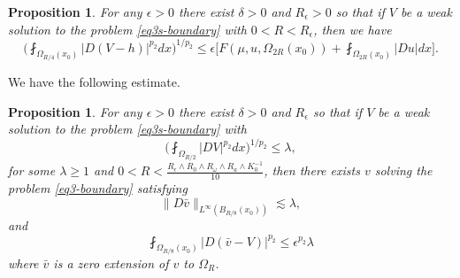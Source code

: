 \documentclass[a4paper,10pt]{amsart}
\newtheorem{prop}[thm]{Proposition}
\newcommand{\lesi}{\lesssim}
\newcommand{\f}{\frac}
\newcommand{\om}{\omega}
\newcommand{\Om}{\Omega}
\newcommand{\vc}{\infty}
\begin{document}
\begin{prop}
	\label{prop3-boundary}
	For any $\epsilon > 0$ there exist $\delta>0$ and $R_\epsilon>0$ so that if $V$ be a weak solution to the problem \eqref{eq3s-boundary} with $0<R<R_\epsilon$, then we have
	\begin{equation}\label{eq2-prop3-boundary}
	\Big(\fint_{\Om_{R/4}(x_0)}|D(V-h)|^{p_2}dx\Big)^{1/p_2}\leq \epsilon\Big[F(\mu,u,\Om_{2R}(x_0))+\fint_{\Om_{2R}(x_0)}|Du|dx\Big].
	\end{equation}
\end{prop}
We have the following estimate.
\begin{prop}
	\label{prop3-boundary}
	For any $\epsilon > 0$ there exist $\delta>0$ and $R_\epsilon$ so that if $V$ be a weak solution to the problem \eqref{eq3s-boundary} with
	\begin{equation}\label{eq-ineq Vp2}
	\Big(\fint_{\Om_{R/2}}|DV|^{p_2}dx\Big)^{1/p_2}\leq \lambda,
	\end{equation}
	for some $\lambda\geq 1$ and $0<R<\f{R_{\epsilon}\wedge R_0\wedge R_\om\wedge R_a \wedge K_0^{-1}}{10}$, then there exists $v$ solving the problem \eqref{eq3-boundary} satisfying
		\begin{equation}\label{eq1-prop4}
		\|D\bar{v}\|_{L^{\vc}(B_{R/8}(x_0))}\lesi \lambda,
	\end{equation}
	and
	\begin{equation}
	\label{eq2-prop4}
	\fint_{\Om_{R/8}(x_0)}|D(\bar{v}-V)|^{p_2}\leq \epsilon^{p_2}\lambda
	\end{equation}
	where $\bar{v}$ is a zero extension of $v$ to $\Om_R$.
	\end{prop}
\end{document}
